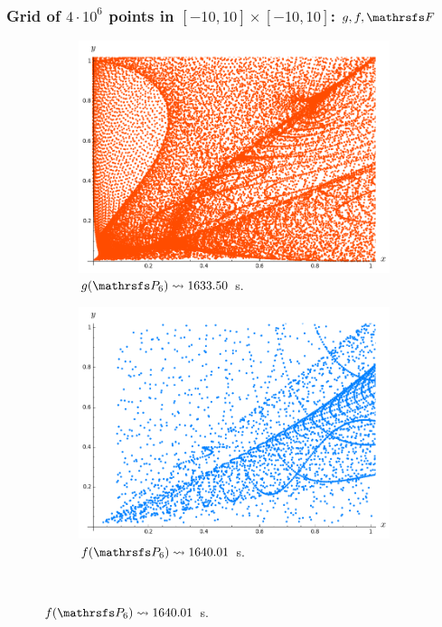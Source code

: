 \documentclass{beamer}
\begin{document}
\begin{frame}
\frametitle{Grid of $4\cdot 10^6$ points in $[-10, 10] \times [-10, 10]$: $g,f,\FFF$}

\begin{figure}
\vspace{-0.2cm}
\begin{subfigure}{.38\linewidth}\centering
\includegraphics[width=1\textwidth]{plots/ch5_17_P6prime.png}
\vspace{-0.1cm}\caption{$g(\PP_6)\leadsto 1633.50$ s.}
\end{subfigure}
\hspace{0.8cm}
\begin{subfigure}{.38\linewidth}\centering
\includegraphics[width=1\textwidth]{plots/ch5_20_P6prime.png}
\vspace{-0.1cm}\caption{$f(\PP_6)\leadsto 1640.01$ s.}
\end{subfigure}\\[1ex]


\end{figure}
\end{frame}
\end{document}
